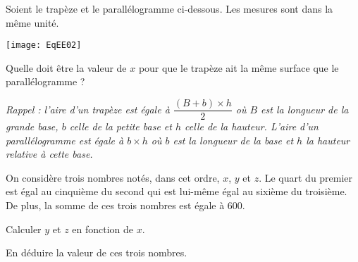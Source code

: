 \begin{exercice}
\end{exercice}



\begin{exercice}
Soient le trapèze et le parallélogramme ci-dessous. Les mesures sont dans la même unité.

\texttt{[image: EqEE02]}

Quelle doit être la valeur de $x$ pour que le trapèze ait la même surface que le parallélogramme ?

\textit{Rappel : l'aire d'un trapèze est égale à $\dfrac{(B+b)\times h}{2}$ où $B$ est la longueur de la grande base, $b$ celle de la petite base et $h$ celle de la hauteur. L'aire d'un parallélogramme est égale à $b\times h$ où $b$ est la longueur de la base et $h$ la hauteur relative à cette base.}
\end{exercice}



\begin{exercice}

On considère trois nombres notés, dans cet ordre, $x$, $y$ et $z$. Le quart du premier est égal au cinquième du second qui est lui-même égal au sixième du troisième. De plus, la somme de ces trois nombres est égale à 600.

\begin{colenumerate}{1} 
\item Calculer $y$ et $z$ en fonction de $x$.
\item En déduire la valeur de ces trois nombres.
\end{colenumerate}
\end{exercice}
